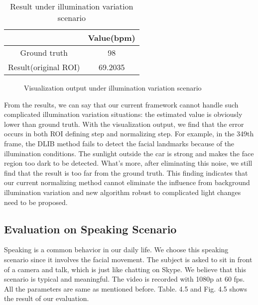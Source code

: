 \begin{table}[htbp]
\centering
\caption{Result under illumination variation scenario} \label{tab:simpletable}
\begin{tabular}{|c|c|}
    \hline
     & Value(bpm) \\
    \hline
    Ground truth & 98 \\
    \hline
    Result(original ROI) & 69.2035 \\
    \hline
\end{tabular}
\end{table}

\begin{figure}[ht]
\hspace{-0.3in}
\caption{Visualization output under illumination variation scenario}\label{fig:noted-figure}
\end{figure}

From the results, we can say that our current framework cannot handle such complicated illumination variation situations: the estimated value is obviously lower than ground truth. With the visualization output, we find that the error occurs in both ROI defining step and normalizing step. For example, in the 349th frame, the DLIB method fails to detect the facial landmarks because of the illumination conditions. The sunlight outside the car is strong and makes the face region too dark to be detected. What’s more, after eliminating this noise, we still find that the result is too far from the ground truth. This finding indicates that our current normalizing method cannot eliminate the influence from background illumination variation and new algorithm robust to complicated light changes need to be proposed.

\subsection{Evaluation on Speaking Scenario} 
Speaking is a common behavior in our daily life. We choose this speaking scenario since it involves the facial movement. The subject is asked to sit in front of a camera and talk, which is just like chatting on Skype. We believe that this scenario is typical and meaningful. The video is recorded with 1080p at 60 fps. All the parameters are same as mentioned before. Table. 4.5 and Fig. 4.5 shows the result of our evaluation. 


